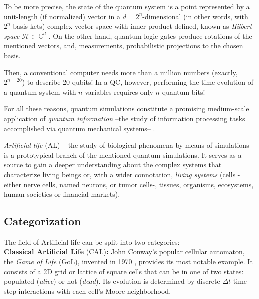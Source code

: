 \documentclass[11pt]{article}
\numberwithin{equation}{section} %
\numberwithin{figure}{section} %
\begin{document}
To be more precise, the state of the quantum system is a point represented by a unit-length (if normalized) vector in a $d=2^n$-dimensional (in other words, with $2^n$ basis kets) complex vector space with inner product defined, known as \emph{Hilbert space} $\mathcal{H}\subset\mathbb{C}^d$ \cite[p.~5, l.~29-30]{Shor}. On the other hand, quantum logic gates produce rotations of the mentioned vectors, and, measurements, probabilistic projections to the chosen basis.

Then, a conventional computer needs more than a million numbers (exactly, $2^{n=20}$) to describe 20 qubits! In a QC, however,  performing the time evolution of a quantum system with $n$ variables requires only $n$ quantum bits! $\,$  \cite[p.~1074, l.~1]{Lloyd}

 For all these reasons, quantum simulations constitute a promising medium-scale application of \emph{quantum information} \cite[p.~48, l.~11]{Nielsen} --the study of information processing tasks accomplished via quantum mechanical systems-- \cite[p.~1, l.~33-34 \& p.~51, l.~3-8]{Nielsen}. 

\emph{Artificial life} (AL) -- the study of biological phenomena by means of simulations -- is a prototypical branch of the mentioned quantum simulations. It serves as a source to gain a deeper understanding about the complex systems that characterize living beings or, with a wider connotation, \emph{living systems} (cells -either nerve cells, named neurons, or tumor cells-, tissues, organisms, ecosystems, human societies or   financial markets). \cite[p.~47]{Ricard_Sole}

\subsection{Categorization} \label{Categorization}

The field of Artificial life can be split into two categories:\\

\textbf{Classical Artificial Life} (CAL)\textbf{:} John Conway's popular cellular automaton, the \emph{Game of Life} (GoL), invented in 1970 \cite[p.~40]{Ricard_Sole}, provides its most notable example. It consists of a 2D grid or lattice of square cells that can be in one of two states: populated (\emph{alive}) or not (\emph{dead}). Its evolution is determined by discrete $\Delta t$ time step interactions with each cell's Moore neighborhood.
\end{document}

